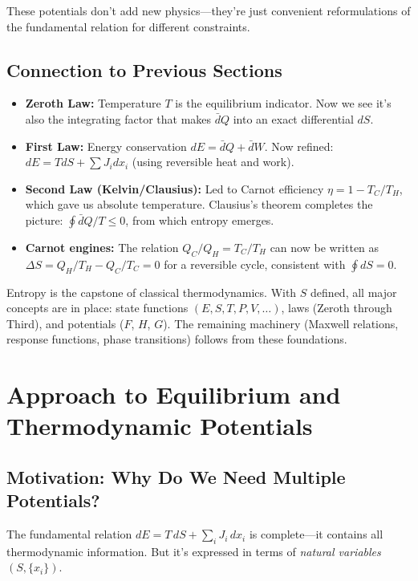 \documentclass[9pt,twocoloumn]{article}
\begin{document}
These potentials don't add new physics—they're just convenient reformulations of the fundamental relation for different constraints.

\subsection{Connection to Previous Sections}

\begin{itemize}
    \item \textbf{Zeroth Law:} Temperature $T$ is the equilibrium indicator. Now we see it's also the integrating factor that makes $\bar{d}Q$ into an exact differential $dS$.

    \item \textbf{First Law:} Energy conservation $dE = \bar{d}Q + \bar{d}W$. Now refined: $dE = T dS + \sum J_i dx_i$ (using reversible heat and work).

    \item \textbf{Second Law (Kelvin/Clausius):} Led to Carnot efficiency $\eta = 1 - T_C/T_H$, which gave us absolute temperature. Clausius's theorem completes the picture: $\oint \bar{d}Q/T \leq 0$, from which entropy emerges.

    \item \textbf{Carnot engines:} The relation $Q_C/Q_H = T_C/T_H$ can now be written as $\Delta S = Q_H/T_H - Q_C/T_C = 0$ for a reversible cycle, consistent with $\oint dS = 0$.
\end{itemize}

Entropy is the capstone of classical thermodynamics. With $S$ defined, all major concepts are in place: state functions $(E, S, T, P, V, \ldots)$, laws (Zeroth through Third), and potentials ($F$, $H$, $G$). The remaining machinery (Maxwell relations, response functions, phase transitions) follows from these foundations.

\section{Approach to Equilibrium and Thermodynamic Potentials}

\subsection{Motivation: Why Do We Need Multiple Potentials?}

The fundamental relation $dE = T \, dS + \sum_i J_i \, dx_i$ is complete—it contains all thermodynamic information. But it's expressed in terms of \emph{natural variables} $(S, \{x_i\})$.
\end{document}
